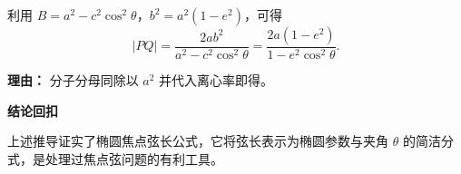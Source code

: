 \begin{proofbox}
\begin{description}[style=nextline, leftmargin=2.8em, labelsep=0.5em, itemsep=0.55em]
		\item[\textbf{步骤五（常用形式）：}] 利用 $B = a^2 - c^2\cos^2\theta$，$b^2 = a^2(1-e^2)$，可得
		      \[
			      |PQ| = \frac{2ab^2}{a^2-c^2\cos^2\theta} = \frac{2a(1-e^2)}{1-e^2\cos^2\theta}.
		      \]
		      \par\textbf{理由：} 分子分母同除以 $a^2$ 并代入离心率即得。

	\end{description}

	\medskip

	\textbf{\textcolor{CProof}{结论回扣}}

	上述推导证实了椭圆焦点弦长公式，它将弦长表示为椭圆参数与夹角 $\theta$ 的简洁分式，是处理过焦点弦问题的有利工具。

\end{proofbox}